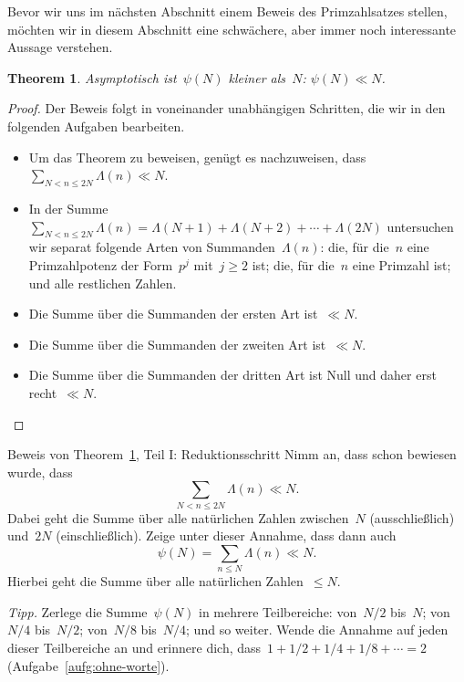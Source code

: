 \documentclass[twoside]{../zirkelblatt1415}
\theoremstyle{definition}
\theoremstyle{plain}
\newtheorem{thm}[defn]{Theorem}
\theoremstyle{remark}
\begin{document}
Bevor wir uns im nächsten Abschnitt einem Beweis des Primzahlsatzes stellen,
möchten wir in diesem Abschnitt eine schwächere, aber immer noch interessante
Aussage verstehen.

\begin{thm}\label{thm:psi-obere-schranke}
Asymptotisch ist~$\psi(N)$ kleiner als~$N$: $\psi(N) \ll N$.
\end{thm}

\begin{proof}Der Beweis folgt in voneinander unabhängigen Schritten, die wir in
den folgenden Aufgaben bearbeiten.
\begin{itemize}
\item Um das Theorem zu beweisen, genügt es nachzuweisen, dass~$\sum_{N < n
\leq 2N} \Lambda(n) \ll N$.
\item In der Summe~$\sum_{N < n \leq 2N} \Lambda(n) = \Lambda(N+1) +
\Lambda(N+2) + \cdots + \Lambda(2N)$ untersuchen wir separat folgende Arten von
Summanden~$\Lambda(n)$: die, für die~$n$ eine Primzahlpotenz der Form~$p^j$
mit~$j \geq 2$ ist; die, für die~$n$ eine Primzahl ist; und alle restlichen
Zahlen.
\item Die Summe über die Summanden der ersten Art ist~$\ll N$.
\item Die Summe über die Summanden der zweiten Art ist~$\ll N$.
\item Die Summe über die Summanden der dritten Art ist Null und daher erst
recht~$\ll N$. \qedhere
\end{itemize}
\end{proof}

\begin{aufgabe}{Beweis von Theorem~\ref{thm:psi-obere-schranke}, Teil I:
Reduktionsschritt}
Nimm an, dass schon bewiesen wurde, dass
\[ \sum_{N < n \leq 2N} \Lambda(n) \ll N. \]
Dabei geht die Summe über alle natürlichen Zahlen zwischen~$N$ (ausschließlich)
und~$2N$ (einschließlich). Zeige unter dieser Annahme, dass dann auch
\[ \psi(N) = \sum_{n \leq N} \Lambda(n) \ll N. \]
Hierbei geht die Summe über alle natürlichen Zahlen~$\leq N$.

\emph{Tipp.} Zerlege die Summe~$\psi(N)$ in mehrere Teilbereiche:
von~$N/2$ bis~$N$; von~$N/4$ bis~$N/2$; von~$N/8$ bis~$N/4$; und so weiter.
Wende die Annahme auf jeden dieser Teilbereiche an und erinnere dich, dass~$1 +
1/2 + 1/4 + 1/8 + \cdots = 2$ (Aufgabe~\ref{aufg:ohne-worte}).
\end{aufgabe}
\end{document}
